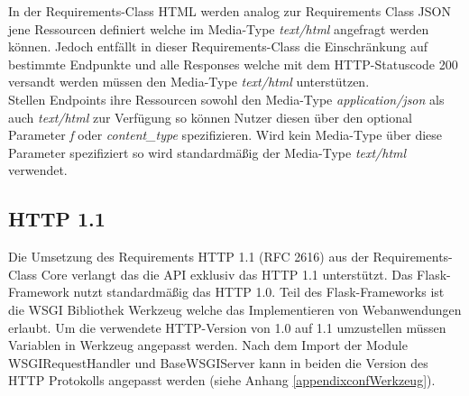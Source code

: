 In der Requirements-Class HTML werden analog zur Requirements Class JSON jene Ressourcen definiert welche im Media-Type \textit{text/html} angefragt werden können. Jedoch
entfällt in dieser Requirements-Class die Einschränkung auf bestimmte Endpunkte und alle Responses welche mit dem HTTP-Statuscode 200 versandt werden müssen den 
Media-Type \textit{text/html} unterstützen.\\
Stellen Endpoints ihre Ressourcen sowohl den Media-Type \textit{application/json} als auch \textit{text/html} zur Verfügung so können Nutzer diesen über den optional Parameter
\textit{f} oder \textit{content\_type} spezifizieren. Wird kein Media-Type über diese Parameter spezifiziert so wird standardmäßig der Media-Type \textit{text/html} verwendet. \\

\subsection{HTTP 1.1}
Die Umsetzung des Requirements HTTP 1.1 (RFC 2616) aus der Requirements-Class Core verlangt das die API exklusiv das HTTP 1.1 unterstützt. 
Das Flask-Framework nutzt standardmäßig das HTTP 1.0. Teil des Flask-Frameworks ist die WSGI Bibliothek Werkzeug welche
das Implementieren von Webanwendungen erlaubt. Um die verwendete HTTP-Version von 1.0 auf 1.1 umzustellen müssen Variablen 
in Werkzeug angepasst werden. Nach dem Import der Module WSGIRequestHandler und BaseWSGIServer kann in beiden die 
Version des HTTP Protokolls angepasst werden (siehe Anhang \ref{appendixconfWerkzeug}). 

